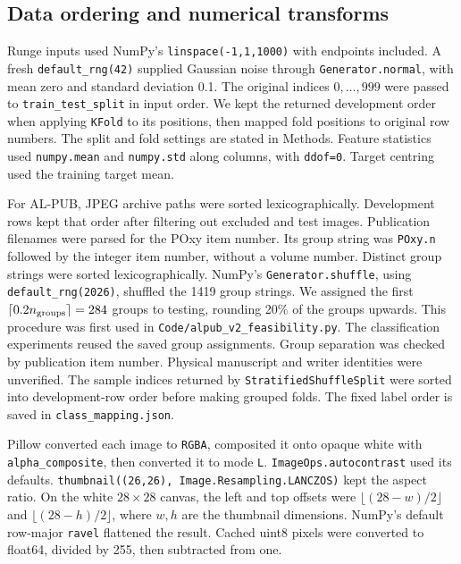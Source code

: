 \subsection{Data ordering and numerical transforms}
Runge inputs used NumPy's \nolinkurl{linspace(-1,1,1000)} with endpoints
included. A fresh \nolinkurl{default_rng(42)} supplied Gaussian noise
through \nolinkurl{Generator.normal}, with mean zero and standard
deviation 0.1. The original indices $0,\ldots,999$ were passed to
\nolinkurl{train_test_split} in input order. We kept the returned
development order when applying \nolinkurl{KFold} to its positions, then
mapped fold positions to original row numbers. The split and fold
settings are stated in Methods. Feature statistics used
\nolinkurl{numpy.mean} and \nolinkurl{numpy.std} along columns, with
\nolinkurl{ddof=0}. Target centring used the training target mean.

For AL-PUB, JPEG archive paths were sorted lexicographically. Development
rows kept that order after filtering out excluded and test images.
Publication filenames were parsed for the POxy item number. Its group
string was \nolinkurl{POxy.n} followed by the integer item number,
without a volume number. Distinct group strings were sorted
lexicographically. NumPy's \nolinkurl{Generator.shuffle}, using
\nolinkurl{default_rng(2026)}, shuffled the 1419 group strings. We assigned
the first $\lceil0.2n_{\rm groups}\rceil=284$ groups to testing, rounding
20\% of the groups upwards. This procedure was first used in
\nolinkurl{Code/alpub_v2_feasibility.py}. The classification experiments reused the saved group assignments. Group separation was checked by
publication item number. Physical manuscript and writer identities were
unverified. The sample indices returned by \nolinkurl{StratifiedShuffleSplit} were sorted into
development-row order before making grouped folds. The fixed label order
is saved in \nolinkurl{class_mapping.json}.

Pillow converted each image to \nolinkurl{RGBA}, composited it onto opaque
white with \nolinkurl{alpha_composite}, then converted it to mode
\nolinkurl{L}. \nolinkurl{ImageOps.autocontrast} used its defaults.
\nolinkurl{thumbnail((26,26), Image.Resampling.LANCZOS)} kept the aspect
ratio. On the white $28\times28$ canvas, the left and top offsets were
$\lfloor(28-w)/2\rfloor$ and $\lfloor(28-h)/2\rfloor$, where $w,h$ are
the thumbnail dimensions. NumPy's default row-major \nolinkurl{ravel}
flattened the result. Cached uint8 pixels were converted to float64,
divided by 255, then subtracted from one.

